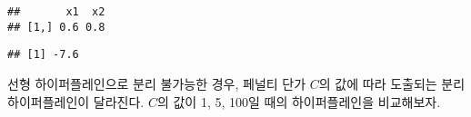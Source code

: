 \documentclass[
]{book}
\newenvironment{Shaded}{\begin{snugshade}}{\end{snugshade}}
\newcommand{\FunctionTok}[1]{\textcolor[rgb]{0.00,0.00,0.00}{#1}}
\newcommand{\NormalTok}[1]{#1}
\newcommand{\OtherTok}[1]{\textcolor[rgb]{0.56,0.35,0.01}{#1}}
\newcommand{\SpecialCharTok}[1]{\textcolor[rgb]{0.00,0.00,0.00}{#1}}
\begin{document}
\begin{verbatim}
##       x1  x2
## [1,] 0.6 0.8
\end{verbatim}

\begin{Shaded}
\end{Shaded}

\begin{verbatim}
## [1] -7.6
\end{verbatim}

선형 하이퍼플레인으로 분리 불가능한 경우, 페널티 단가 \(C\)의 값에 따라 도출되는 분리 하이퍼플레인이 달라진다. \(C\)의 값이 1, 5, 100일 때의 하이퍼플레인을 비교해보자.
\end{document}
